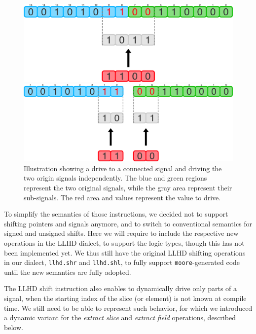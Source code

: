 \begin{figure}[ht]
    \centering
    \begin{minipage}{0.49\textwidth}
        \includegraphics[width=\textwidth]{gfx/DrvConn.png}
    \end{minipage}
    \hfill
    \begin{minipage}{0.49\textwidth}
        \includegraphics[width=\textwidth]{gfx/DrvSplit.png}
    \end{minipage}
    \caption[Driving a connected signal vs. driving the two origin signals independently.]{Illustration showing a drive to a connected signal and driving the two origin signals independently. The blue and green regions represent the two original signals, while the gray area represent their sub-signals. The red area and values represent the value to drive.}
    \label{fig:drvconn}
\end{figure}

To simplify the semantics of those instructions, we decided not to support shifting pointers and signals anymore, and to switch to conventional semantics for signed and unsigned shifts. Here we will require to include the respective new operations in the LLHD dialect, to support the logic types, though this has not been implemented yet. We thus still have the original LLHD shifting operations in our dialect, \texttt{llhd.shr} and \texttt{llhd.shl}, to fully support \texttt{moore}-generated code until the new semantics are fully adopted.

The LLHD shift instruction also enables to dynamically drive only parts of a signal, when the starting index of the slice (or element) is not known at compile time. We still need to be able to represent such behavior, for which we introduced a dynamic variant for the \textit{extract slice} and \textit{extract field} operations, described below.

